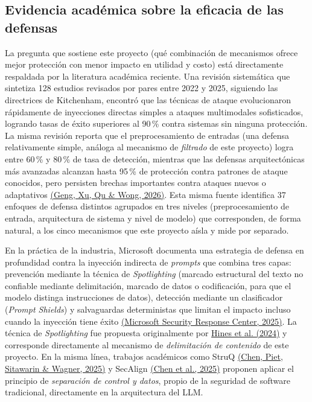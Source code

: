\documentclass[11pt,letterpaper]{article}
\newcommand{\citeapa}[2]{\hyperlink{#1}{#2}}
\begin{document}
\subsection{Evidencia académica sobre la eficacia de las defensas}

La pregunta que sostiene este proyecto (qué combinación de mecanismos ofrece mejor protección con menor impacto en utilidad y costo) está directamente respaldada por la literatura académica reciente. Una revisión sistemática que sintetiza 128 estudios revisados por pares entre 2022 y 2025, siguiendo las directrices de Kitchenham, encontró que las técnicas de ataque evolucionaron rápidamente de inyecciones directas simples a ataques multimodales sofisticados, logrando tasas de éxito superiores al 90\,\% contra sistemas sin ninguna protección. La misma revisión reporta que el preprocesamiento de entradas (una defensa relativamente simple, análoga al mecanismo de \emph{filtrado} de este proyecto) logra entre 60\,\% y 80\,\% de tasa de detección, mientras que las defensas arquitectónicas más avanzadas alcanzan hasta 95\,\% de protección contra patrones de ataque conocidos, pero persisten brechas importantes contra ataques nuevos o adaptativos \citeapa{geng2026}{(Geng, Xu, Qu \& Wong, 2026)}. Esta misma fuente identifica 37 enfoques de defensa distintos agrupados en tres niveles (preprocesamiento de entrada, arquitectura de sistema y nivel de modelo) que corresponden, de forma natural, a los cinco mecanismos que este proyecto aísla y mide por separado.

En la práctica de la industria, Microsoft documenta una estrategia de defensa en profundidad contra la inyección indirecta de \emph{prompts} que combina tres capas: prevención mediante la técnica de \emph{Spotlighting} (marcado estructural del texto no confiable mediante delimitación, marcado de datos o codificación, para que el modelo distinga instrucciones de datos), detección mediante un clasificador (\emph{Prompt Shields}) y salvaguardas deterministas que limitan el impacto incluso cuando la inyección tiene éxito \citeapa{microsoft2025}{(Microsoft Security Response Center, 2025)}. La técnica de \emph{Spotlighting} fue propuesta originalmente por \citeapa{hines2024}{Hines et al. (2024)} y corresponde directamente al mecanismo de \emph{delimitación de contenido} de este proyecto. En la misma línea, trabajos académicos como StruQ \citeapa{struq2025}{(Chen, Piet, Sitawarin \& Wagner, 2025)} y SecAlign \citeapa{secalign2025}{(Chen et al., 2025)} proponen aplicar el principio de \emph{separación de control y datos}, propio de la seguridad de software tradicional, directamente en la arquitectura del LLM.
\end{document}
